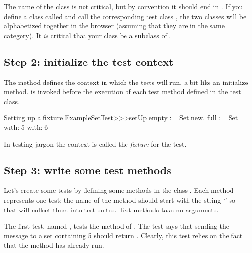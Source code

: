 \documentclass[a4paper,10pt,twoside]{book}
\begin{document}
The name of the class is not critical, but by convention it should end in .
If you define a class called  and call the corresponding test class , the two classes will be alphabetized together in the browser (assuming that they are in the same category).  It \emph{is} critical that your class be a subclass of .
\subsection{Step 2: initialize the test context}

The method  defines the context in which the tests will run, a bit like an initialize method.
 is invoked before the execution of each test
method defined in the test class.


\begin{method}[setupExampleSetTest]{Setting up a fixture}
ExampleSetTest>>>setUp
	empty := Set new.
	full := Set with: 5 with: 6
\end{method}

\noindent
In testing jargon the context is called the \emph{fixture} for the
test.

\subsection{Step 3: write some test methods}

Let's create some tests by defining some methods in the class
.  
Each method represents one test; 
the name of the method should start with the string `' so that \sunit
will collect them into test suites.
Test methods take no arguments.

The first test, named , tests the
 method of .  The test says that sending the
message  to a set containing 5 should return
.  Clearly, this test relies on the fact
that the  method has already run.
\end{document}
